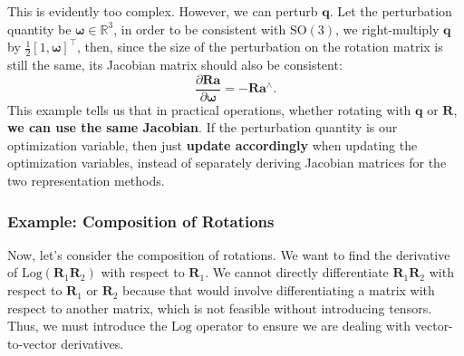 This is evidently too complex. However, we can perturb $\mathbf{q}$. Let the perturbation quantity be $\boldsymbol{\omega}
\in \mathbb{R}^3$, in order to be consistent with $\mathrm{SO}(3)$, we right-multiply $\mathbf{q}$ by $\frac{1}{2}[1, 
\boldsymbol{\omega}]^\top$, then, since the size of the perturbation on the rotation matrix is still the same, its Jacobian matrix should also be consistent:
\begin{equation}\label{key}
	\frac{{\partial \mathbf{R} \mathbf{a}}}{{\partial \boldsymbol{\omega} }} = - \mathbf{R} {\mathbf{a}^\wedge}.
\end{equation}
This example tells us that in practical operations, whether rotating with $\mathbf{q}$ or $\mathbf{R}$, \textbf{we can use the same Jacobian}. If the perturbation quantity is our optimization variable, then just \textbf{update accordingly} when updating the optimization variables, instead of separately deriving Jacobian matrices for the two representation methods.

\subsubsection{Example: Composition of Rotations}

Now, let's consider the composition of rotations. We want to find the derivative of $\mathrm{Log}(\mathbf{R}_1 \mathbf{R}_2)$ with respect to $\mathbf{R}_1$. We cannot directly differentiate $\mathbf{R}_1 \mathbf{R}_2$ with respect to $\mathbf{R}_1$ or $\mathbf{R}_2$ because that would involve differentiating a matrix with respect to another matrix, which is not feasible without introducing tensors. Thus, we must introduce the $\mathrm{Log}$ operator to ensure we are dealing with vector-to-vector derivatives. 

